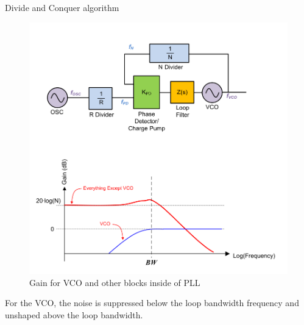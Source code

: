 \documentclass{article}
\begin{document}
Divide and Conquer algorithm


\begin{figure}[!ht]
	\includegraphics[width=\linewidth]{Figures/PLL_basics_regarding_VCO.png}
	\caption{Gain for VCO and  other blocks inside of PLL}
	\label{fig:PLL_basics_regarding_VCO	}
\end{figure}

\begin{info}
	For the VCO, the noise is suppressed below the loop bandwidth frequency and unshaped above the loop bandwidth.
\end{info}







\end{document}
